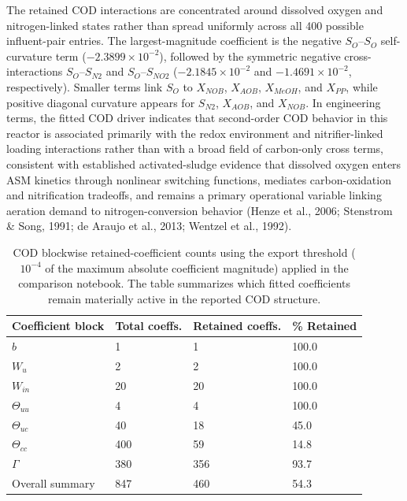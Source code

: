 \documentclass[a4paper,fleqn]{cas-sc}
\newenvironment{revblock}{\begingroup\color{revDefault}}{\endgroup}
\newenvironment{revblockr21}{\begingroup\color{revRtwoOne}}{\endgroup}
\begin{document}
\begin{revblock}
\begin{revblockr21}
The retained COD interactions are concentrated around dissolved oxygen and nitrogen-linked states rather than spread uniformly across all 400 possible influent-pair entries. The largest-magnitude coefficient is the negative $S_O$--$S_O$ self-curvature term ($-2.3899 \times 10^{-2}$), followed by the symmetric negative cross-interactions $S_O$--$S_{N2}$ and $S_O$--$S_{NO2}$ ($-2.1845 \times 10^{-2}$ and $-1.4691 \times 10^{-2}$, respectively). Smaller terms link $S_O$ to $X_{NOB}$, $X_{AOB}$, $X_{MeOH}$, and $X_{PP}$, while positive diagonal curvature appears for $S_{N2}$, $X_{AOB}$, and $X_{NOB}$. In engineering terms, the fitted COD driver indicates that second-order COD behavior in this reactor is associated primarily with the redox environment and nitrifier-linked loading interactions rather than with a broad field of carbon-only cross terms, consistent with established activated-sludge evidence that dissolved oxygen enters ASM kinetics through nonlinear switching functions, mediates carbon-oxidation and nitrification tradeoffs, and remains a primary operational variable linking aeration demand to nitrogen-conversion behavior (Henze et al., 2006; Stenstrom \& Song, 1991; de Araujo et al., 2013; Wentzel et al., 1992).

\begin{table}[htbp]
\centering
\caption{COD blockwise retained-coefficient counts using the export threshold ($10^{-4}$ of the maximum absolute coefficient magnitude) applied in the comparison notebook. The table summarizes which fitted coefficients remain materially active in the reported COD structure.}
\label{tab:results_icsor_regularization_sample}
\scriptsize
\setlength{\tabcolsep}{4pt}
\begin{tabular}{p{3.0cm}p{2.1cm}p{2.4cm}p{2.0cm}}
\hline
Coefficient block & Total coeffs. & Retained coeffs. & \% Retained \\
\hline
$b$ & 1 & 1 & 100.0 \\
$W_u$ & 2 & 2 & 100.0 \\
$W_{in}$ & 20 & 20 & 100.0 \\
$\Theta_{uu}$ & 4 & 4 & 100.0 \\
$\Theta_{uc}$ & 40 & 18 & 45.0 \\
$\Theta_{cc}$ & 400 & 59 & 14.8 \\
$\Gamma$ & 380 & 356 & 93.7 \\
Overall summary & 847 & 460 & 54.3 \\
\hline
\end{tabular}
\end{table}


\end{revblockr21}
\end{revblock}
\end{document}
